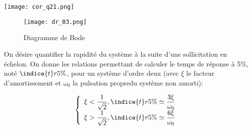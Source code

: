 \ifprof
\begin{corrige}%
\begin{center}
\texttt{[image: cor\_q21.png]}
\end{center}
\end{corrige}
\else
\fi

\ifprof
\else

\begin{figure}[!h]
\centering
\texttt{[image: dr\_03.png]}
\caption{Diagramme de Bode \label{dr_03}}
\end{figure}

 On désire quantifier la rapidité du système à la suite d’une sollicitation en échelon. On donne les 
relations permettant de calculer le temps de réponse à 5\%, noté $\indice{t}{r5\%}$, pour un système d’ordre deux (avec $\xi$ le facteur d’amortissement et $\omega_0$ la pulsation propredu système non amorti):

$$
\left\{ 
\begin{array}{l}
\xi < \dfrac{1}{\sqrt{2}}, \indice{t}{r5\%} \simeq \dfrac{3\xi}{ \omega_0} \\
\xi > \dfrac{1}{\sqrt{2}}, \indice{t}{r5\%} \simeq \dfrac{6\xi }{\omega_0} \\
\end{array}
\right.
$$ 
\fi



